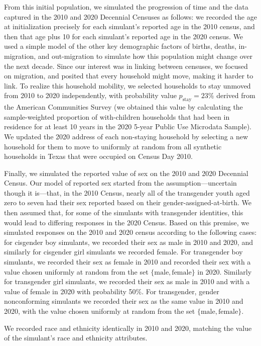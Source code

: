 \documentclass{jpc} %
\theoremstyle{plain}\newtheorem{satz}[thm]{Satz} %
\begin{document}
From this initial population, we simulated the progression of time and the data captured in the 2010 and 2020 Decennial Censuses as follows: we recorded the age at initialization precisely for each simulant's reported age in the 2010 census, and then that age plus 10 for each simulant's reported age in the 2020 census.  We used a simple model of the other key demographic factors of births, deaths, in-migration, and out-migration to simulate how this population might change over the next decade. Since our interest was in linking between censuses, we focused on migration, and posited that every household might move, making it harder to link. To realize this household mobility, we selected households to stay unmoved from 2010 to 2020 independently, with probability value $p_{\text{stay}} = 23\%$ derived from the American Communities Survey (we obtained this value by calculating the sample-weighted proportion of with-children households that had been in residence for at least 10 years in the 2020 5-year Public Use Microdata Sample).  We updated the 2020 address of each non-staying household by selecting a new household for them to move to uniformly at random from all synthetic households in Texas that were occupied on Census Day 2010.

Finally, we simulated the reported value of sex on the 2010 and 2020 Decennial Census. Our model of reported sex started from the assumption---uncertain though it is---that, in the 2010 Census, nearly all of the transgender youth aged zero to seven had their sex reported based on their gender-assigned-at-birth. We then assumed that, for some of the simulants with transgender identities, this would lead to differing responses in the 2020 Census.
Based on this premise, we simulated responses on the 2010 and 2020 census according to the following cases: for cisgender boy simulants, we recorded their sex as male in 2010 and 2020, and similarly for cisgender girl simulants we recorded female.  For transgender boy simulants, we recorded their sex as female in 2010 and recorded their sex with a value chosen uniformly at random from the set $\{\text{male}, \text{female}\}$ in 2020.  Similarly for transgender girl simulants, we recorded their sex as male in 2010 and with a value of female in 2020 with probability 50\%.  For transgender, gender nonconforming simulants we recorded their sex as the same value in 2010 and 2020, with the value chosen uniformly at random from the set $\{\text{male}, \text{female}\}$.

We recorded race and ethnicity identically in 2010 and 2020, matching the value of the simulant's race and ethnicity attributes.
\end{document}
